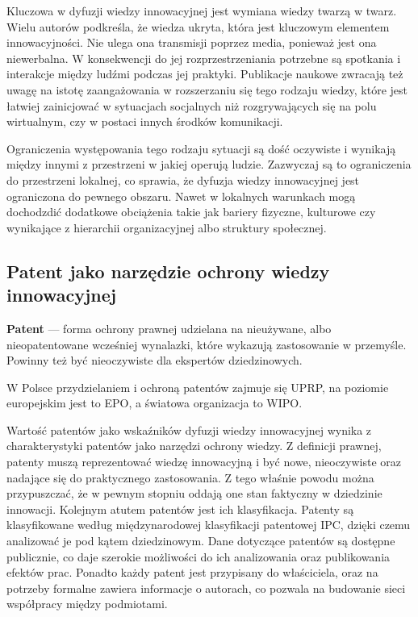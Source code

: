 Kluczowa w dyfuzji wiedzy innowacyjnej jest wymiana wiedzy
twarzą w twarz. Wielu autorów podkreśla, że wiedza ukryta,
która jest kluczowym elementem innowacyjności. Nie ulega
ona transmisji poprzez media, ponieważ jest ona niewerbalna.
W konsekwencji do jej rozprzestrzeniania potrzebne są spotkania
i interakcje między ludźmi podczas jej praktyki. Publikacje
naukowe zwracają też uwagę na istotę zaangażowania w rozszerzaniu
się tego rodzaju wiedzy, które jest łatwiej zainicjować w
sytuacjach socjalnych niż rozgrywających się na polu wirtualnym,
czy w postaci innych środków komunikacji.

Ograniczenia występowania tego rodzaju sytuacji są dość oczywiste i
wynikają między innymi z przestrzeni w jakiej operują ludzie.
Zazwyczaj są to ograniczenia do przestrzeni lokalnej, co sprawia,
że dyfuzja wiedzy innowacyjnej jest ograniczona do pewnego obszaru.
Nawet w lokalnych warunkach mogą dochodzdić dodatkowe obciążenia
takie jak bariery fizyczne, kulturowe czy wynikające z hierarchii
organizacyjnej albo struktury społecznej.


\subsection{Patent jako narzędzie ochrony wiedzy innowacyjnej}

\begin{defi}
\textbf{Patent} --- forma ochrony prawnej udzielana na nieużywane, 
albo nieopatentowane wcześniej wynalazki, które wykazują 
zastosowanie w przemyśle. Powinny też być nieoczywiste dla 
ekspertów dziedzinowych.
\end{defi}

W Polsce przydzielaniem i ochroną patentów zajmuje się \ac{UPRP}, 
na poziomie europejskim jest to \ac{EPO}, a światowa organizacja 
to \ac{WIPO}.

Wartość patentów jako wskaźników dyfuzji wiedzy innowacyjnej
wynika z charakterystyki patentów jako narzędzi ochrony wiedzy.
Z definicji prawnej, patenty muszą reprezentować wiedzę innowacyjną
i być nowe, nieoczywiste oraz nadające się do praktycznego
zastosowania. Z tego właśnie powodu można przypuszczać, że
w pewnym stopniu oddają one stan faktyczny w dziedzinie innowacji.
Kolejnym atutem patentów jest ich klasyfikacja.
Patenty są klasyfikowane według międzynarodowej klasyfikacji
patentowej \ac{IPC}, dzięki czemu analizować je pod kątem dziedzinowym.
Dane dotyczące patentów są dostępne publicznie, co daje 
szerokie możliwości do ich analizowania oraz publikowania efektów
prac. Ponadto każdy patent jest przypisany do właściciela, oraz
na potrzeby formalne zawiera informacje o autorach, co pozwala
na budowanie sieci współpracy między podmiotami.


